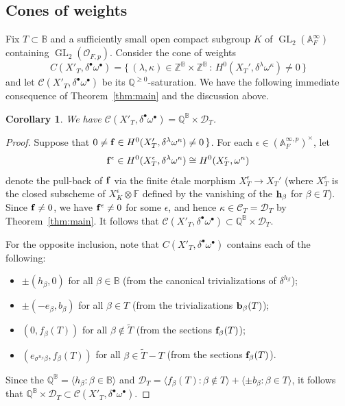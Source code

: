 \documentclass[11pt,pdflatex]{amsart}
\theoremstyle{plain}
\theoremstyle{definition}
\newcommand{\FF}{\mathbf{F}}
\newcommand{\QQ}{\mathbf{Q}}
\newcommand{\ZZ}{\mathbf{Z}}
\newcommand{\CO}{\mathcal{O}}
\theoremstyle{plain}
\newtheorem{cor}[theorem]{Corollary}
\theoremstyle{definition}
\theoremstyle{remark}
\numberwithin{equation}{section}
\numberwithin{figure}{section} \numberwithin{table}{subsection}
\newcommand{\GL}{{\operatorname{GL}}}
\def\AA{\mathbb{A}}
\def\BB{\mathbb{B}}
\def\FF{\mathbb{F}}
\def\QQ{\mathbb{Q}}
\def\ZZ{\mathbb{Z}}
\begin{document}
\subsection{Cones of weights}
Fix $T \subset \BB$ and a sufficiently small open compact subgroup $K$ of $\GL_2(\AA_F^\infty)$ containing $\GL_2(\CO_{F,p})$.  Consider the cone of weights 
$$C(X'_T,\delta^\bullet\omega^\bullet)= \{\,(\lambda,\kappa) \in \ZZ^\BB \times \ZZ^\BB\,:\, H^0(X_T',\delta^\lambda\omega^\kappa)\neq 0 \,\}$$
and let $\mathcal{C}(X'_T,\delta^\bullet\omega^\bullet)$ be its $\QQ^{\ge 0}$-saturation.  We have the following immediate consequence of Theorem~\ref{thm:main} and the discussion above.
\begin{cor} \label{cor:main} We have $\mathcal{C}(X'_T,\delta^\bullet\omega^\bullet)= \QQ^{\BB} \times \mathcal{D}_T$.
\end{cor}
\begin{proof} Suppose that $0 \neq {\bf f} \in H^0(X_T',\delta^\lambda\omega^\kappa)\neq 0 \,\}$.
For each $\epsilon \in (\AA_F^{\infty,p})^\times$, let 
$${\bf f}^\epsilon \in H^0(X^\epsilon_T, \delta^{\lambda}\omega^{\kappa}) \cong H^0(X^\epsilon_T, \omega^{\kappa})$$
 denote the pull-back of ${\bf f}$ via the finite \'etale morphism $X_T^\epsilon \to X_T'$ (where $X_T^\epsilon$ is the closed subscheme of $X_K^\epsilon\otimes\FF$ defined by the vanishing of the ${\bf h}_\beta$ for $\beta\in T$). 
Since ${\bf f} \neq 0$, we have ${\bf f}^\epsilon \neq 0$ for some $\epsilon$, and hence $\kappa \in \mathcal{C}_T = \mathcal{D}_T$ by Theorem~\ref{thm:main}.  It follows that $\mathcal{C}(X'_T,\delta^\bullet\omega^\bullet)\subset \QQ^{\BB} \times \mathcal{D}_T$.

For the opposite inclusion, note that $C(X'_T,\delta^\bullet\omega^\bullet)$ contains each of the following:
\begin{itemize}
\item $\pm(h_\beta,0)$ for all $\beta\in \BB$ (from the canonical trivializations of $\delta^{h_\beta}$);
\item $\pm(-e_\beta,b_\beta)$ for all $\beta \in T$ (from the trivializations ${\bf b}_\beta(T)$);
\item $(0,f_\beta(T))$ for all $\beta\notin \widetilde{T}$ (from the sections ${\bf f}_\beta(T)$);
\item $(e_{\sigma^{n_\beta}\beta},f_\beta(T))$ for all $\beta\in \widetilde{T} - T$ (from the sections ${\bf f}_\beta(T)$).
\end{itemize}
Since the $\QQ^\BB = \langle h_\beta : \beta \in \BB \rangle$ and
$\mathcal{D}_T = \langle f_\beta(T) : \beta \not\in T \rangle
 + \langle \pm b_\beta : \beta \in T \rangle$, it follows that 
$ \QQ^{\BB} \times \mathcal{D}_T\subset \mathcal{C}(X'_T,\delta^\bullet\omega^\bullet)$.
\end{proof}
\end{document}
